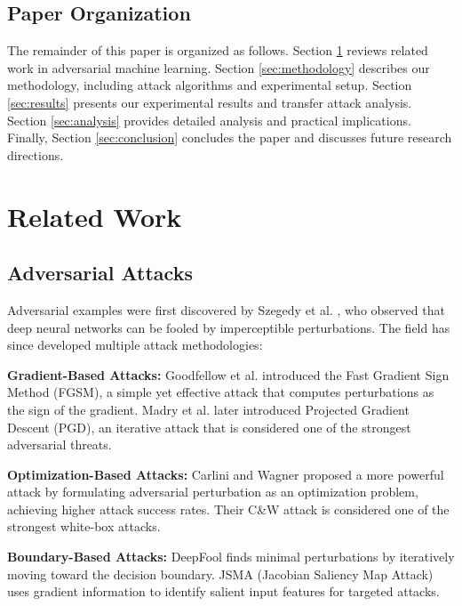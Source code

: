 \documentclass[10pt,conference]{IEEEtran}
\begin{document}
\subsection{Paper Organization}

The remainder of this paper is organized as follows. Section \ref{sec:related} reviews related work in adversarial machine learning. Section \ref{sec:methodology} describes our methodology, including attack algorithms and experimental setup. Section \ref{sec:results} presents our experimental results and transfer attack analysis. Section \ref{sec:analysis} provides detailed analysis and practical implications. Finally, Section \ref{sec:conclusion} concludes the paper and discusses future research directions.

\section{Related Work}
\label{sec:related}

\subsection{Adversarial Attacks}

Adversarial examples were first discovered by Szegedy et al. \cite{szegedy2013intriguing}, who observed that deep neural networks can be fooled by imperceptible perturbations. The field has since developed multiple attack methodologies:

\textbf{Gradient-Based Attacks:} Goodfellow et al. \cite{goodfellow2015explaining} introduced the Fast Gradient Sign Method (FGSM), a simple yet effective attack that computes perturbations as the sign of the gradient. Madry et al. \cite{madry2019deep} later introduced Projected Gradient Descent (PGD), an iterative attack that is considered one of the strongest adversarial threats.

\textbf{Optimization-Based Attacks:} Carlini and Wagner \cite{carlini2017towards} proposed a more powerful attack by formulating adversarial perturbation as an optimization problem, achieving higher attack success rates. Their C\&W attack is considered one of the strongest white-box attacks.

\textbf{Boundary-Based Attacks:} DeepFool \cite{moosavi2016deepfool} finds minimal perturbations by iteratively moving toward the decision boundary. JSMA (Jacobian Saliency Map Attack) \cite{papernot2016limitations} uses gradient information to identify salient input features for targeted attacks.
\end{document}
